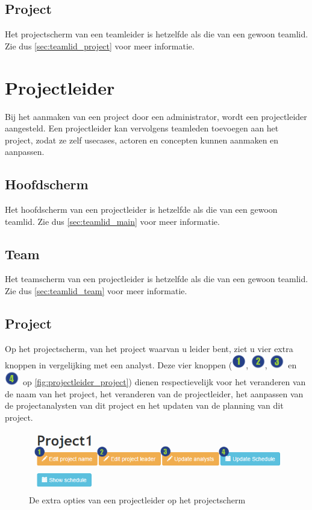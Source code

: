 \documentclass[a4paper,11pt]{article}
\newcommand{\one}{\includegraphics[scale=0.5]{Gebruikershandleiding_img/1.png}}
\newcommand{\two}{\includegraphics[scale=0.5]{Gebruikershandleiding_img/2.png}}
\newcommand{\three}{\includegraphics[scale=0.5]{Gebruikershandleiding_img/3.png}}
\newcommand{\four}{\includegraphics[scale=0.5]{Gebruikershandleiding_img/4.png}}
\begin{document}
\subsection{Project}
\label{sec:teamleider_project}
Het projectscherm van een teamleider is hetzelfde als die van een gewoon teamlid. Zie dus  \autoref{sec:teamlid_project} voor meer informatie.

\section{Projectleider}
\label{sec:projectleider}
Bij het aanmaken van een project door een administrator, wordt een projectleider aangesteld. Een projectleider kan vervolgens teamleden toevoegen aan het project, zodat ze zelf usecases, actoren en concepten kunnen aanmaken en aanpassen.

\subsection{Hoofdscherm}
\label{sec:projectleider_main}
Het hoofdscherm van een projectleider is hetzelfde als die van een gewoon teamlid. Zie dus \autoref{sec:teamlid_main} voor meer informatie.

\subsection{Team}
\label{sec:projectleider_team}
Het teamscherm van een projectleider is hetzelfde als die van een gewoon teamlid. Zie dus  \autoref{sec:teamlid_team} voor meer informatie.

\subsection{Project}
\label{sec:projectleider_project}
Op het projectscherm, van het project waarvan u leider bent, ziet u vier extra knoppen in vergelijking met een analyst. Deze vier knoppen (\one, \two, \three\ en \four\ op \autoref{fig:projectleider_project}) dienen respectievelijk voor het veranderen van de naam van het project, het veranderen van de projectleider, het aanpassen van de projectanalysten van dit project en het updaten van de planning van dit project.


\begin{figure}[H]
\centering
\includegraphics[scale=0.5]{Gebruikershandleiding_img/leader_project.png}
\caption{De extra opties van een projectleider op het projectscherm}
\label{fig:projectleider_project}
\end{figure}
\end{document}

